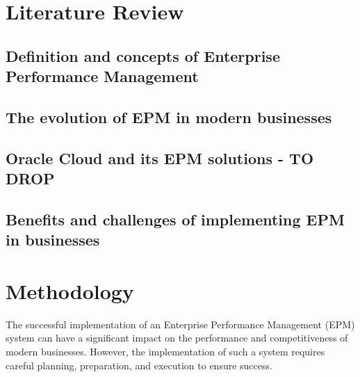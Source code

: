 \documentclass[12pt,a4paper,openright,twoside]{book}
\begin{document}
\chapter{Literature Review}
\label{chap:background}

\section{Definition and concepts of Enterprise Performance Management}

\section{The evolution of EPM in modern businesses}

\section{Oracle Cloud and its EPM solutions - TO DROP}



\section{Benefits and challenges of implementing EPM in businesses}

\chapter{Methodology}
\label{chap:design}

The successful implementation of an Enterprise Performance Management (EPM) system can have a significant impact on the performance and competitiveness of modern businesses. 
%
However, the implementation of such a system requires careful planning, preparation, and execution to ensure success. 
\end{document}
